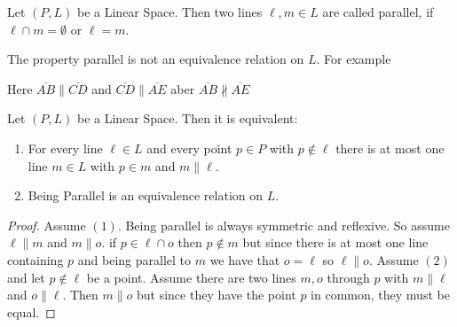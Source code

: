 \begin{Def}
Let \((P,L)\) be a Linear Space.
Then two lines \(\ell,m\in L\) are called parallel, if \(\ell\cap m=\emptyset\) or \(\ell=m\).
\end{Def}
\begin{Bsp}
    The property parallel is not an equivalence relation on \(L\).
    For example
    \begin{figure}[H]
    \centering
\end{figure}

Here \(\overline{AB}\parallel \overline{CD}\) and \( \overline{CD} \parallel \overline{AE}\) aber 
\(\overline{AB}\not\parallel \overline{AE}\) 
\end{Bsp}
\begin{Satz}
Let \((P,L)\) be a Linear Space.
Then it is equivalent:
\begin{enumerate}
\item For every line \(\ell\in L\) and every point \(p\in P\) with \(p\not\in \ell\) there is at most 
one line \(m\in L\) with \(p\in m\) and \(m\parallel \ell\). 
\item Being Parallel is an equivalence relation on \(L\).
\end{enumerate}
\end{Satz}
\begin{proof}
    Assume \((1)\).
    Being parallel is always symmetric and reflexive.
    So assume \(\ell\parallel m\) and \(m\parallel o\).
    if \(p\in \ell\cap o\) then \(p\not\in m\) but since there is at most one line containing \(p\) and 
    being parallel to \(m\) we have that \(o=\ell\) so \(\ell\parallel o\).
    Assume \((2)\) and let \(p\not\in \ell\) be a point.
    Assume there are two lines \(m,o\) through \(p\) with
    \(m\parallel \ell\) and \(o\parallel \ell\). Then \(m\parallel o\) but since they have the point 
    \(p\) in common, they must be equal.
\end{proof}

